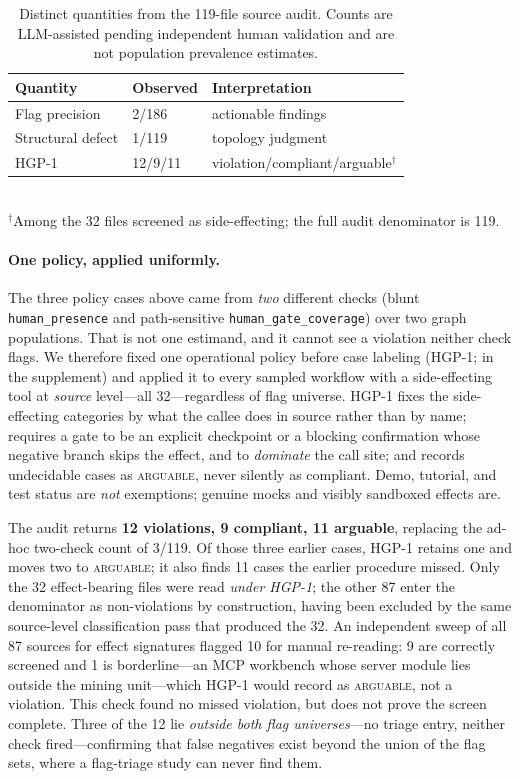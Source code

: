 \begin{table}[t]
\centering\small
\caption{Distinct quantities from the 119-file source audit. Counts are
LLM-assisted pending independent human validation and are not population
prevalence estimates.}
\label{tab:estimands}
\begin{tabular}{@{}lll@{}}
\toprule
\textbf{Quantity} & \textbf{Observed} & \textbf{Interpretation} \\
\midrule
Flag precision & 2/186 & actionable findings \\
Structural defect & 1/119 & topology judgment \\
HGP-1 & 12/9/11 & violation/compliant/arguable$^\dagger$ \\
\bottomrule
\end{tabular}\\[2pt]
{\footnotesize $^\dagger$Among the 32 files screened as side-effecting; the
full audit denominator is 119.}
\end{table}

\paragraph{One policy, applied uniformly.}
The three policy cases above came from \emph{two} different checks (blunt
\texttt{human\_presence} and path-sensitive \texttt{human\_gate\_coverage}) over
two graph populations. That is not one estimand, and it cannot see a violation
neither check flags. We therefore fixed one operational policy before case
labeling (HGP-1; in the supplement) and applied it to every sampled workflow
with a side-effecting tool at \emph{source} level---all 32---regardless of flag
universe. HGP-1 fixes the side-effecting categories by what the callee does in
source rather than by name; requires a gate to be an explicit checkpoint or a
blocking confirmation whose negative branch skips the effect, and to
\emph{dominate} the call site; and records undecidable cases as
\textsc{arguable}, never silently as compliant. Demo, tutorial, and test status
are \emph{not} exemptions; genuine mocks and visibly sandboxed effects are.

The audit returns \textbf{12 violations, 9 compliant, 11 arguable}, replacing
the ad-hoc two-check count of 3/119. Of those three earlier cases, HGP-1 retains
one and moves two to \textsc{arguable}; it also finds 11 cases the earlier
procedure missed. Only the 32 effect-bearing files were read \emph{under HGP-1};
the
other 87 enter the denominator as non-violations by construction, having been
excluded by the same source-level classification pass that produced the 32. An
independent sweep of all 87 sources for effect signatures flagged 10 for manual
re-reading: 9 are correctly screened and 1 is borderline---an MCP workbench
whose server module lies outside the mining unit---which HGP-1 would record as
\textsc{arguable}, not a violation. This check found no missed violation, but
does not prove the screen complete. Three of the 12 lie
\emph{outside both flag universes}---no triage entry, neither check
fired---confirming that false negatives exist beyond the union of the flag sets,
where a flag-triage study can never find them.

